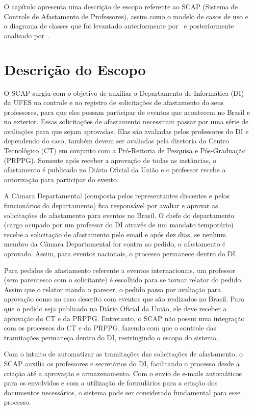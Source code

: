 O capítulo apresenta uma descrição de escopo referente ao SCAP (Sistema de Controle de Afastamento de Professores), assim como o modelo de casos de uso e o diagrama de classes que foi levantado anteriormente por~ e posteriormente analisado por~. 

\section{Descrição do Escopo}
\label{sec-requisitos-descricao-escopo}

O SCAP surgiu com o objetivo de auxiliar o Departamento de Informática (DI) da UFES no controle e no registro de solicitações de afastamento do seus professores, para que eles possam participar de eventos que acontecem no Brasil e no exterior. Essas solicitações de afastamento necessitam passar por uma série de avaliações para que sejam aprovadas. Elas são avaliadas pelos professores do DI e dependendo do caso, também devem ser avaliadas pela diretoria do Centro Tecnológico (CT) em conjunto com a Pró-Reitoria de Pesquisa e Pós-Graduação (PRPPG). Somente após receber a aprovação de todas as instâncias, o afastamento é publicado no Diário Oficial da União e o professor recebe a autorização para participar do evento.     

A Câmara Departamental (composta pelos representantes discentes e pelos funcionários do departamento) fica responsável por avaliar e aprovar as solicitações de afastamento para eventos no Brasil. O chefe do departamento (cargo ocupado por um professor do DI através de um mandato temporário) recebe a solicitação de afastamento pelo email e após dez dias, se nenhum membro da Câmara Departamental for contra ao pedido, o afastamento é aprovado. Assim, para eventos nacionais, o processo permanece dentro do DI.

Para pedidos de afastamento referente a eventos internacionais, um professor (sem parentesco com o solicitante) é escolhido para se tornar relator do pedido. Assim que o relator manda o parecer, o pedido passa por avaliação para aprovação como no caso descrito com eventos que são realizados no Brasil. Para que o pedido seja publicado no Diário Oficial da União, ele deve receber a aprovação do CT e da PRPPG. Entretanto, o SCAP não possui uma integração com os processos do CT e da PRPPG, fazendo com que o controle das tramitações permaneça dentro do DI, restringindo o escopo do sistema.

Com o intuito de automatizar as tramitações das solicitações de afastamento, o SCAP auxilia os professores e secretários do DI, facilitando o processo desde a criação até a aprovação e armazenamento. Com o envio de e-mails automáticos para os envolvidos e com a utilização de formulários para a criação dos documentos necessários, o sistema pode ser considerado fundamental para esse processo.      

